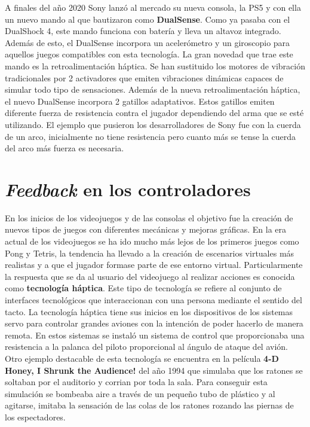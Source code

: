A finales del a\~no 2020 Sony lanz\'o al mercado su nueva consola, la PS5 y con ella un nuevo mando al que bautizaron como \textbf{DualSense}. Como ya pasaba con el DualShock 4, este mando funciona con bater\'ia y lleva un altavoz integrado. Adem\'as de esto, el DualSense incorpora un aceler\'ometro y un giroscopio para aquellos juegos compatibles con esta tecnolog\'ia. La gran novedad que trae este mando es la retroalimentaci\'on h\'aptica. Se han sustituido los motores de vibraci\'on tradicionales por 2 activadores que emiten vibraciones din\'amicas capaces de simular todo tipo de sensaciones. Adem\'as de la nueva retroalimentaci\'on h\'aptica, el nuevo DualSense incorpora 2 gatillos adaptativos. Estos gatillos emiten diferente fuerza de resistencia contra el jugador dependiendo del arma que se est\'e utilizando. El ejemplo que pusieron los desarrolladores de Sony fue con la cuerda de un arco, inicialmente no tiene resistencia pero cuanto m\'as se tense la cuerda del arco m\'as fuerza es necesaria.

\section{\textit{Feedback} en los controladores}

En los inicios de los videojuegos y de las consolas el objetivo fue la creaci\'on de nuevos tipos de juegos con diferentes mec\'anicas y mejoras gr\'aficas. En la era actual de los videojuegos se ha ido mucho m\'as lejos de los primeros juegos como Pong y Tetris, la tendencia ha llevado a la creaci\'on de escenarios virtuales m\'as realistas y a que el jugador formase parte de ese entorno virtual. Particularmente la respuesta que se da al usuario del videojuego al realizar acciones es conocida como \textbf{tecnolog\'ia h\'aptica}. Este tipo de tecnolog\'ia se refiere al conjunto de interfaces tecnol\'ogicos que interaccionan con una persona mediante el sentido del tacto. La tecnolog\'ia h\'aptica tiene sus inicios en los dispositivos de los sistemas servo para controlar grandes aviones con la intenci\'on de poder hacerlo de manera remota. En estos sistemas se instal\'o un sistema de control que proporcionaba una resistencia a la palanca del piloto proporcional al \'angulo de ataque del avi\'on. Otro ejemplo destacable de esta tecnolog\'ia se encuentra en la pel\'icula \textbf{4-D Honey, I Shrunk the Audience!} del a\~no 1994 que simulaba que los ratones se soltaban por el auditorio y corrian por toda la sala. Para conseguir esta simulaci\'on se bombeaba aire a trav\'es de un peque\~no tubo de pl\'astico y al agitarse, imitaba la sensaci\'on de las colas de los ratones rozando las piernas de los espectadores. \\


